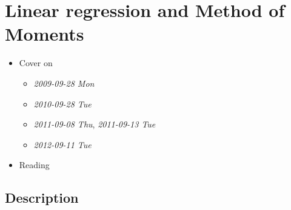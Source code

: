 
\chapter{Linear regression and Method of Moments}

\begin{itemize}
\item Cover on
\begin{itemize}
\item \textit{2009-09-28 Mon}
\item \textit{2010-09-28 Tue}
\item \textit{2011-09-08 Thu}, \textit{2011-09-13 Tue}
\item \textit{2012-09-11 Tue}
\end{itemize}
\item Reading
\end{itemize}
\section{Description}
\label{sec-1}

